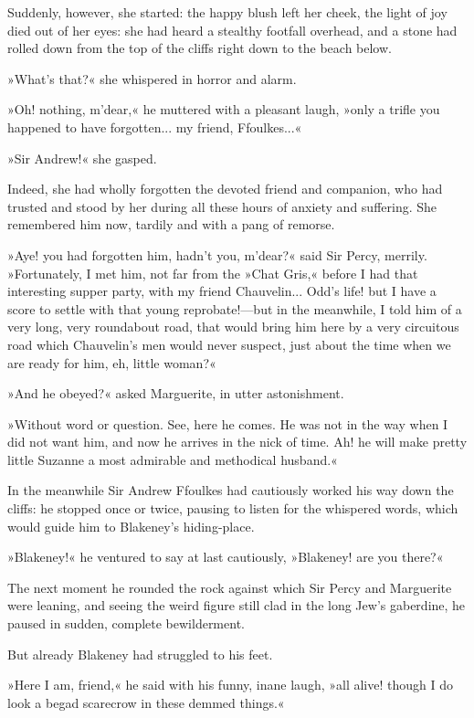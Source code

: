 Suddenly, however, she started: the happy blush left her cheek, the light of joy died out of her eyes: she had heard a stealthy footfall overhead, and a stone had rolled down from the top of the cliffs right down to the beach below.

»What's that?« she whispered in horror and alarm.

»Oh! nothing, m'dear,« he muttered with a pleasant laugh, »only a trifle you happened to have forgotten... my friend, Ffoulkes...«

»Sir Andrew!« she gasped.

Indeed, she had wholly forgotten the devoted friend and companion, who had trusted and stood by her during all these hours of anxiety and suffering. She remembered him now, tardily and with a pang of remorse.

»Aye! you had forgotten him, hadn't you, m'dear?« said Sir Percy, merrily. »Fortunately, I met him, not far from the »Chat Gris,« before I had that interesting supper party, with my friend Chauvelin... Odd's life! but I have a score to settle with that young reprobate!\allowbreak---\allowbreak but in the meanwhile, I told him of a very long, very roundabout road, that would bring him here by a very circuitous road which Chauvelin's men would never suspect, just about the time when we are ready for him, eh, little woman?«

»And he obeyed?« asked Marguerite, in utter astonishment.

»Without word or question. See, here he comes. He was not in the way when I did not want him, and now he arrives in the nick of time. Ah! he will make pretty little Suzanne a most admirable and methodical husband.«

In the meanwhile Sir Andrew Ffoulkes had cautiously worked his way down the cliffs: he stopped once or twice, pausing to listen for the whispered words, which would guide him to Blakeney's hiding-place.

»Blakeney!« he ventured to say at last cautiously, »Blakeney! are you there?«

The next moment he rounded the rock against which Sir Percy and Marguerite were leaning, and seeing the weird figure still clad in the long Jew's gaberdine, he paused in sudden, complete bewilderment.

But already Blakeney had struggled to his feet.

»Here I am, friend,« he said with his funny, inane laugh, »all alive! though I do look a begad scarecrow in these demmed things.«

